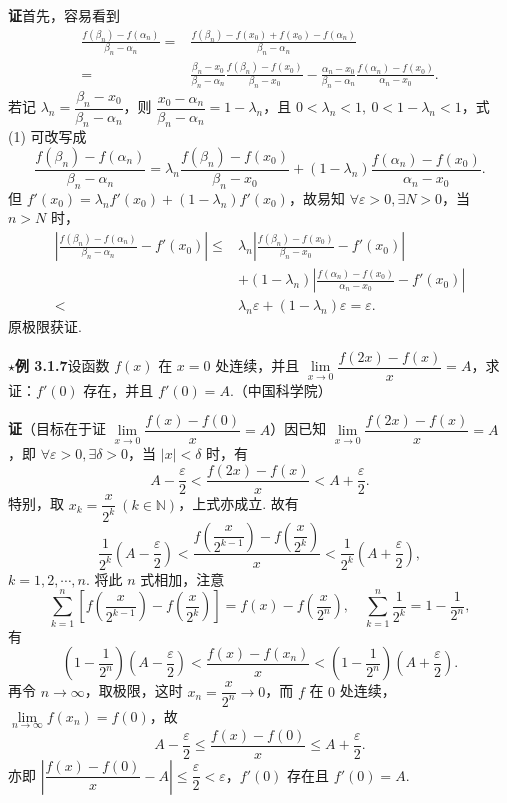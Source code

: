 \documentclass[UTF8,12pt,a4paper,fontset=fandol]{ctexart}
\begin{document}
\noindent\textbf{证}\quad 首先，容易看到
\begin{equation}
\begin{aligned}
\frac{f(\beta_n)-f(\alpha_n)}{\beta_n-\alpha_n}
={}&\frac{f(\beta_n)-f(x_0)+f(x_0)-f(\alpha_n)}{\beta_n-\alpha_n}\\
={}&\frac{\beta_n-x_0}{\beta_n-\alpha_n}\frac{f(\beta_n)-f(x_0)}{\beta_n-x_0}
  -\frac{\alpha_n-x_0}{\beta_n-\alpha_n}\frac{f(\alpha_n)-f(x_0)}{\alpha_n-x_0}.
\end{aligned}
\tag{1}
\end{equation}
若记 $\lambda_n=\dfrac{\beta_n-x_0}{\beta_n-\alpha_n}$，则 $\dfrac{x_0-\alpha_n}{\beta_n-\alpha_n}=1-\lambda_n$，且 $0<\lambda_n<1,\ 0<1-\lambda_n<1$，式 (1) 可改写成
\[
  \frac{f(\beta_n)-f(\alpha_n)}{\beta_n-\alpha_n}
  =\lambda_n\frac{f(\beta_n)-f(x_0)}{\beta_n-x_0}
  +(1-\lambda_n)\frac{f(\alpha_n)-f(x_0)}{\alpha_n-x_0}.
\]
但 $f'(x_0)=\lambda_n f'(x_0)+(1-\lambda_n)f'(x_0)$，故易知 $\forall\varepsilon>0,\exists N>0$，当 $n>N$ 时，
\[
\begin{aligned}
\left|\frac{f(\beta_n)-f(\alpha_n)}{\beta_n-\alpha_n}-f'(x_0)\right|
\le{}&\lambda_n\left|\frac{f(\beta_n)-f(x_0)}{\beta_n-x_0}-f'(x_0)\right|\\
&+(1-\lambda_n)\left|\frac{f(\alpha_n)-f(x_0)}{\alpha_n-x_0}-f'(x_0)\right|\\
<&\lambda_n\varepsilon+(1-\lambda_n)\varepsilon=\varepsilon.
\end{aligned}
\]
原极限获证.

\noindent\textbf{$\star$例 3.1.7}\quad 设函数 $f(x)$ 在 $x=0$ 处连续，并且 $\lim\limits_{x\to0}\dfrac{f(2x)-f(x)}x=A$，求证：$f'(0)$ 存在，并且 $f'(0)=A$.（中国科学院）

\noindent\textbf{证}\quad （目标在于证 $\lim\limits_{x\to0}\dfrac{f(x)-f(0)}x=A$）因已知 $\lim\limits_{x\to0}\dfrac{f(2x)-f(x)}x=A$，即 $\forall\varepsilon>0,\exists\delta>0$，当 $|x|<\delta$ 时，有
\[
  A-\frac\varepsilon2<\frac{f(2x)-f(x)}x<A+\frac\varepsilon2.
\]
特别，取 $x_k=\dfrac{x}{2^k}\ (k\in\mathbb N)$，上式亦成立. 故有
\[
  \frac1{2^k}\left(A-\frac\varepsilon2\right)
  <\frac{f\left(\dfrac{x}{2^{k-1}}\right)-f\left(\dfrac{x}{2^k}\right)}x
  <\frac1{2^k}\left(A+\frac\varepsilon2\right),
\]
$k=1,2,\cdots,n$. 将此 $n$ 式相加，注意
\[
  \sum_{k=1}^n\left[f\left(\frac{x}{2^{k-1}}\right)-f\left(\frac{x}{2^k}\right)\right]
  =f(x)-f\left(\frac{x}{2^n}\right),\quad
  \sum_{k=1}^n\frac1{2^k}=1-\frac1{2^n},
\]
有
\[
  \left(1-\frac1{2^n}\right)\left(A-\frac\varepsilon2\right)
  <\frac{f(x)-f(x_n)}x
  <\left(1-\frac1{2^n}\right)\left(A+\frac\varepsilon2\right).
\]
再令 $n\to\infty$，取极限，这时 $x_n=\dfrac{x}{2^n}\to0$，而 $f$ 在 $0$ 处连续，$\lim\limits_{n\to\infty}f(x_n)=f(0)$，故
\[
  A-\frac\varepsilon2\le\frac{f(x)-f(0)}x\le A+\frac\varepsilon2.
\]
亦即 $\left|\dfrac{f(x)-f(0)}x-A\right|\le\dfrac\varepsilon2<\varepsilon$，$f'(0)$ 存在且 $f'(0)=A$.
\end{document}
